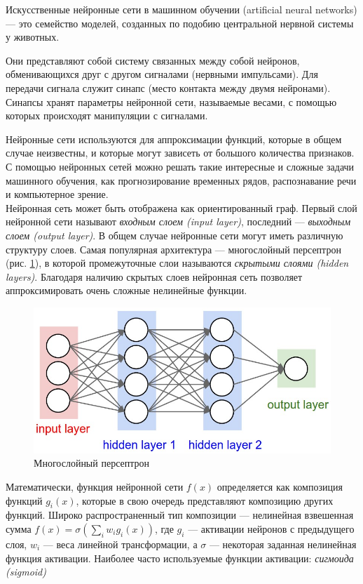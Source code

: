 \documentclass[12pt]{article}
\begin{document}
Искусственные нейронные сети в машинном обучении (artificial neural networks) --- это семейство моделей, созданных по подобию центральной нервной системы у животных. 

Они представляют собой систему связанных между собой нейронов, обменивающихся друг с другом сигналами (нервными импульсами). Для передачи сигнала служит синапс (место контакта между двумя нейронами). Синапсы хранят параметры нейронной сети, называемые весами, с помощью которых происходят манипуляции с сигналами.


Нейронные сети используются для аппроксимации функций, которые в общем случае неизвестны, и которые могут зависеть от большого количества признаков. С помощью нейронных сетей можно решать такие интересные и сложные задачи машинного обучения, как прогнозирование временных рядов, распознавание речи и компьютерное зрение.\\

Нейронная сеть может быть отображена как ориентированный граф. Первый слой нейронной сети называют \textit{входным слоем (input layer)}, последний --- \textit{выходным слоем (output layer)}. В общем случае нейронные сети могут иметь различную структуру слоев. Самая популярная архитектура --- многослойный персептрон (рис. \ref{fig:mlp}), в которой промежуточные слои называются \textit{скрытыми слоями (hidden layers)}. Благодаря наличию скрытых слоев нейронная сеть позволяет аппроксимировать очень сложные нелинейные функции.

\begin{figure}[h!]
\centering
\includegraphics[scale=0.4]{mlp.jpeg}
\caption{Многослойный персептрон} \label{fig:mlp}
\end{figure}


Математически, функция нейронной сети $f(x)$ определяется как композиция функций $g_i(x)$, которые в свою очередь представляют композицию других функций. Широко распространенный тип композиции --- нелинейная взвешенная сумма $f(x) = \sigma(\sum_i w_i g_i(x))$, где $g_i$ --- активации нейронов с предыдущего слоя, $w_i$ --- веса линейной трансформации, а $\sigma$ --- некоторая заданная нелинейная функция активации. Наиболее часто используемые функции активации: \textit{сигмоида (sigmoid)}
\end{document}
